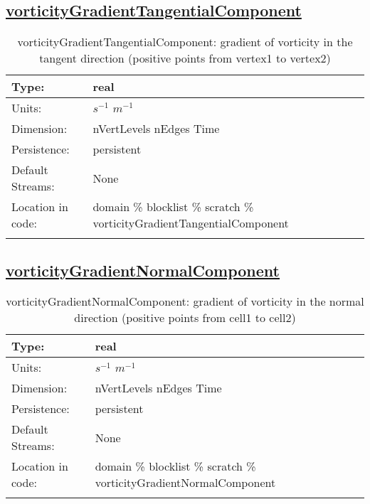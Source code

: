 \subsection[vorticityGradientTangentialComponent]{\hyperref[sec:var_tab_scratch]{vorticityGradientTangentialComponent}}
\label{subsec:var_sec_scratch_vorticityGradientTangentialComponent}
\begin{center}
\begin{longtable}{| p{2.0in} | p{4.0in} |}
        \hline 
        Type: & real \\
        \hline 
        Units: & $s^{-1}$ $m^{-1}$ \\
        \hline 
        Dimension: & nVertLevels nEdges Time \\
        \hline 
        Persistence: & persistent \\
        \hline 
		 Default Streams: & None \\
        \hline 
		 Location in code: & domain \% blocklist \% scratch \% vorticityGradientTangentialComponent \\
		 \hline 
    \caption{vorticityGradientTangentialComponent: gradient of vorticity in the tangent direction (positive points from vertex1 to vertex2)}
\end{longtable}
\end{center}
\subsection[vorticityGradientNormalComponent]{\hyperref[sec:var_tab_scratch]{vorticityGradientNormalComponent}}
\label{subsec:var_sec_scratch_vorticityGradientNormalComponent}
\begin{center}
\begin{longtable}{| p{2.0in} | p{4.0in} |}
        \hline 
        Type: & real \\
        \hline 
        Units: & $s^{-1}$ $m^{-1}$ \\
        \hline 
        Dimension: & nVertLevels nEdges Time \\
        \hline 
        Persistence: & persistent \\
        \hline 
		 Default Streams: & None \\
        \hline 
		 Location in code: & domain \% blocklist \% scratch \% vorticityGradientNormalComponent \\
		 \hline 
    \caption{vorticityGradientNormalComponent: gradient of vorticity in the normal direction (positive points from cell1 to cell2)}
\end{longtable}
\end{center}
